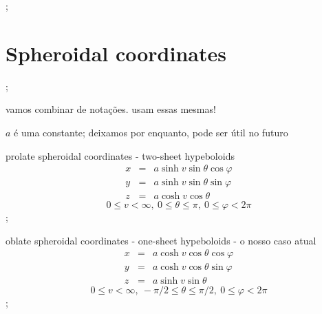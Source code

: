 \documentclass[a4paper,12pt]{article}
\begin{document}
;

\section{Spheroidal coordinates}

;

vamos combinar de nota\c{c}\~{o}es. usam essas mesmas!

$a$ \'{e} uma constante; deixamos por enquanto, pode ser \'{u}til no futuro

prolate spheroidal coordinates - two-sheet hypeboloids%
\begin{eqnarray*}
x &=&a\sinh v\sin \theta \cos \varphi  \\
y &=&a\sinh v\sin \theta \sin \varphi  \\
z &=&a\cosh v\cos \theta 
\end{eqnarray*}%
\begin{equation*}
0\leq v<\infty ,\ 0\leq \theta \leq \pi ,\ 0\leq \varphi <2\pi 
\end{equation*}%
;

oblate spheroidal coordinates - one-sheet hypeboloids - o nosso caso atual%
\begin{eqnarray*}
x &=&a\cosh v\cos \theta \cos \varphi  \\
y &=&a\cosh v\cos \theta \sin \varphi  \\
z &=&a\sinh v\sin \theta 
\end{eqnarray*}%
\begin{equation*}
0\leq v<\infty ,\ -\pi /2\leq \theta \leq \pi /2,\ 0\leq \varphi <2\pi 
\end{equation*}%
;
\end{document}
